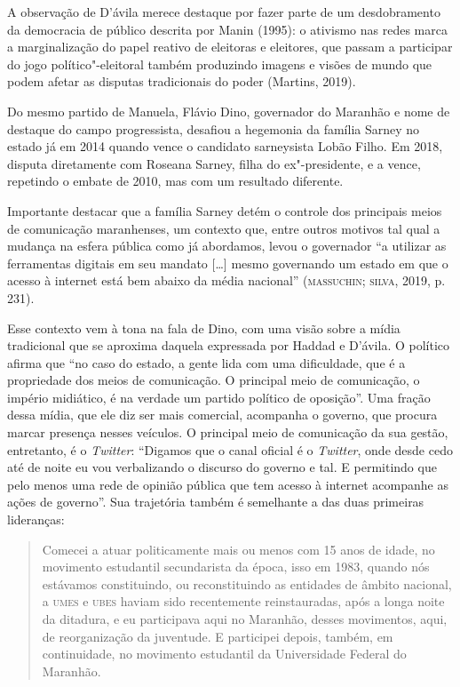 A observação de D'ávila merece destaque por fazer parte de um
desdobramento da democracia de público descrita por Manin (1995): o
ativismo nas redes marca a marginalização do papel reativo de eleitoras
e eleitores, que passam a participar do jogo político"-eleitoral também
produzindo imagens e visões de mundo que podem afetar as disputas
tradicionais do poder (Martins, 2019).

Do mesmo partido de Manuela, Flávio Dino, governador do Maranhão e nome
de destaque do campo progressista, desafiou a hegemonia da família
Sarney no estado já em 2014 quando vence o candidato sarneysista Lobão
Filho. Em 2018, disputa diretamente com Roseana Sarney, filha do
ex"-presidente, e a vence, repetindo o embate de 2010, mas com um
resultado diferente.

Importante destacar que a família Sarney detém o controle dos principais
meios de comunicação maranhenses, um contexto que, entre outros motivos
tal qual a mudança na esfera pública como já abordamos, levou o
governador ``a utilizar as ferramentas digitais em seu mandato {[}\ldots{}{]}
mesmo governando um estado em que o acesso à internet está bem abaixo da
média nacional'' (\textsc{massuchin}; \textsc{silva}, 2019, p. 231).

Esse contexto vem à tona na fala de Dino, com uma visão sobre a mídia
tradicional que se aproxima daquela expressada por Haddad e D'ávila. O
político afirma que ``no caso do estado, a gente lida com uma
dificuldade, que é a propriedade dos meios de comunicação. O principal
meio de comunicação, o império midiático, é na verdade um partido
político de oposição''. Uma fração dessa mídia, que ele diz ser mais
comercial, acompanha o governo, que procura marcar presença nesses
veículos. O principal meio de comunicação da sua gestão, entretanto, é o
\emph{Twitter}: ``Digamos que o canal oficial é o \emph{Twitter}, onde
desde cedo até de noite eu vou verbalizando o discurso do governo e tal.
E permitindo que pelo menos uma rede de opinião pública que tem acesso à
internet acompanhe as ações de governo''. Sua trajetória também é
semelhante a das duas primeiras lideranças:

\begin{quote}
Comecei a atuar politicamente mais ou menos com 15 anos de idade, no
movimento estudantil secundarista da época, isso em 1983, quando nós
estávamos constituindo, ou reconstituindo as entidades de âmbito
nacional, a \textsc{umes} e \textsc{ubes} haviam sido recentemente reinstauradas, após a
longa noite da ditadura, e eu participava aqui no Maranhão, desses
movimentos, aqui, de reorganização da juventude. E participei depois,
também, em continuidade, no movimento estudantil da Universidade Federal
do Maranhão.
\end{quote}

